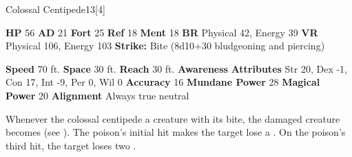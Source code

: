   \begin{monsubsection}{Colossal Centipede}{13}[4]
    \vspace{-1em}\vspace{-1em}
    \vspace{0em}

    
    

    \begin{spellcontent}
      \begin{spelltargetinginfo}
        \pari \textbf{HP} 56 \monsep
          \textbf{AD} 21 \monsep
          \textbf{Fort} 25 \monsep
          \textbf{Ref} 18 \monsep
          \textbf{Ment} 18
        \pari \textbf{BR} Physical 42, Energy 39 \monsep
        \textbf{VR} Physical 106, Energy 103
        \pari \textbf{Strike:}
            Bite  (8d10+30 bludgeoning and piercing)
      \end{spelltargetinginfo}
    \end{spellcontent}
    \begin{monsterfooter}
      \pari \textbf{Speed} 70 ft. \monsep
        \textbf{Space} 30 ft. \monsep
        \textbf{Reach} 30 ft.
      \pari \textbf{Awareness} 
      \pari \textbf{Attributes}
        Str 20, Dex -1,
        Con 17, Int -9,
        Per 0, Wil 0
      \pari \textbf{Accuracy} 16 \monsep
        \textbf{Mundane Power} 28 \monsep
      \textbf{Magical Power} 20
      \pari \textbf{Alignment} Always true neutral
    \end{monsterfooter}
  \end{monsubsection}
        Whenever the colossal centipede  a creature with its bite,
          the damaged creature becomes  (see ).
        The poison's initial hit makes the target lose a .
        On the poison's third hit, the target loses two .
  
